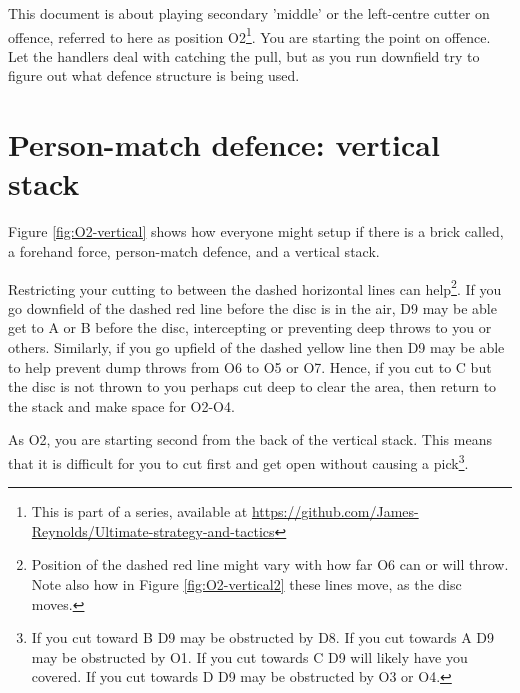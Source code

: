 \documentclass{tufte-handout}
\begin{document}
This document is about 
playing secondary 'middle' 
or the left-centre cutter
on offence,
referred to here 
as position O2\footnote{This
is part of a series, 
available at
\url{https://github.com/James-Reynolds/Ultimate-strategy-and-tactics}}.
You are starting the point on offence. 
Let the handlers 
deal with catching the pull, but
as you run downfield
try to figure out 
what defence structure
is being used. 

\section{Person-match defence: vertical stack}\label{sec:vertical}

Figure \ref{fig:O2-vertical} shows 
how everyone might 
setup 
if there is a brick called,
a forehand force, 
person-match defence, 
and a vertical stack.


Restricting your cutting 
to between 
the dashed 
horizontal 
lines 
can help\footnote{
Position of 
the dashed red line might vary
with how far O6 
can or will 
throw. 
Note also how in 
Figure \ref{fig:O2-vertical2} 
these lines move, 
as the disc moves.}. 
If you go 
downfield of the dashed red line 
before the disc is in the air,
D9 may be able 
get to
A or B 
before the disc,
intercepting 
or preventing 
deep throws to 
you or others. 
Similarly, 
if you go 
upfield of the dashed yellow line
then D9 may 
be able to help
prevent dump throws from O6
to O5 
or O7.
Hence,
if you cut to C
but the disc is not thrown to you
perhaps cut deep 
to clear the area, 
then return to the stack
and make space for O2-O4. 

As O2, 
you are starting 
second from the back 
of the vertical stack. 
This means that it is 
difficult for you to 
cut first 
and get open 
without causing 
a pick\footnote{
If you cut toward B 
D9 may be obstructed by D8. 
If you cut towards A
D9 may be obstructed by O1.
If you cut towards C
D9 will likely have you covered.
If you cut towards D
D9 may be obstructed by O3 
or O4.}.
\end{document}
